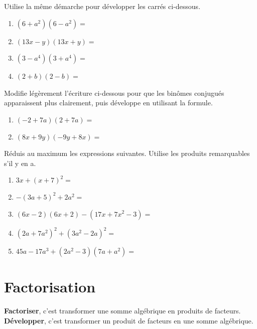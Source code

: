 \documentclass[../../syllabus_2.tex]{subfiles}
\begin{document}
\begin{exercise}
  Utilise la même démarche pour développer les carrés ci-dessous.
  \begin{enumerate}[cols=2, itemsep=2cm]
    \item  $\left(6+a^2\right)\left(6-a^2\right)=$
    \item  $\left(13x-y\right)\left(13x+y\right)=$
    \item  $\left(3-a^4\right)\left(3+a^4\right)=$
    \item  $\left(2+b\right)\left(2-b\right)=$
  \end{enumerate}
\end{exercise}

\newpage
\begin{exercise}
  Modifie légèrement l'écriture ci-dessous pour que les binômes conjugués apparaissent plus clairement, puis développe en utilisant la formule.
  \begin{enumerate}[cols=2]
    \item  $\left(-2+7a\right)\left(2+7a\right)=$
    \item  $\left(8x+9y\right)\left(-9y+8x\right)=$
  \end{enumerate}
\end{exercise}
\vspace*{1cm}

\begin{exercise}
  Réduis au maximum les expressions suivantes. Utilise les produits remarquables s'il y en a.
  \begin{enumerate}[itemsep=3.7cm]
    \item $3x+\left(x+7\right)^2=$
    \item $-\left(3a+5\right)^2 + 2a^2=$
    \item $\left(6x-2\right)\left(6x+2\right) - \left(17x+7x^2-3\right)=$
    \item $\left(2a+7a^2\right)^2 + \left(3a^2-2a\right)^2=$
    \item $45a-17a^3+\left(2a^2-3\right)\left(7a+a^2\right)=$
  \end{enumerate}
\end{exercise}


\newpage
\section{Factorisation}

\textbf{Factoriser}, c'est transformer une somme algébrique en produits de facteurs. \\
\textbf{Développer}, c'est transformer un produit de facteurs en une somme algébrique.
\vspace*{3.9cm}
\end{document}
